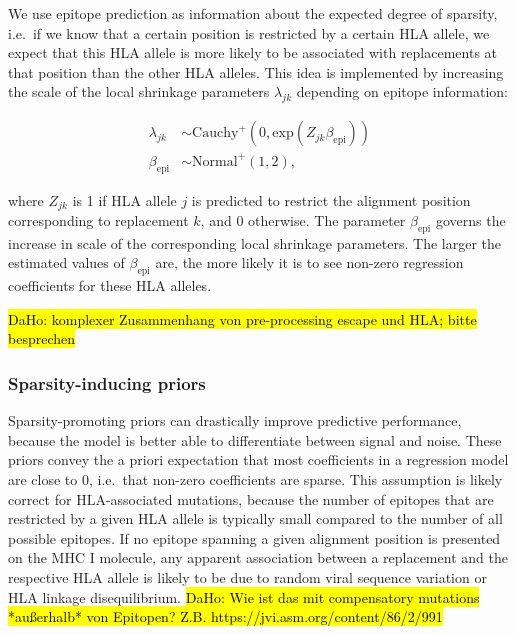 \documentclass{bioinfo}
\begin{document}
\begin{methods}
We use epitope prediction as information about the expected degree of sparsity, i.e.\ if we know that a certain position is restricted by a certain HLA allele, we expect that this HLA allele is more likely to be associated with replacements at that position than the other HLA alleles. This idea is implemented by increasing the scale of the local shrinkage parameters \(\lambda_{jk}\) depending on epitope information:

\begin{equation}
  \begin{aligned}
    \lambda_{jk} &\sim \text{Cauchy}^{+}(0, \text{exp}(Z_{jk}\beta_{\text{epi}})) \\
    \beta_{\text{epi}} &\sim \text{Normal}^{+}(1, 2),
  \end{aligned}
\end{equation}
 
where \(Z_{jk}\) is 1 if HLA allele \(j\) is predicted to restrict the alignment position corresponding to replacement \(k\), and 0 otherwise. The parameter \(\beta_{\text{epi}}\) governs the increase in scale of the  corresponding local shrinkage parameters. The larger the estimated values of \(\beta_{\text{epi}}\) are, the more likely it is to see non-zero regression coefficients for these HLA alleles.

\hl{DaHo: komplexer Zusammenhang von pre-processing escape und HLA; bitte besprechen}

\subsubsection{Sparsity-inducing priors}
  
Sparsity-promoting priors \citep{Piironen2017} can drastically improve predictive performance, because the model is better able to differentiate between signal and noise. These priors convey the a priori expectation that most coefficients in a regression model are close to 0, i.e.\ that non-zero coefficients are sparse. This assumption is likely correct for HLA-associated mutations, because the number of epitopes that are restricted by a given HLA allele is typically small compared to the number of all possible epitopes. If no epitope spanning a given alignment position is presented on the MHC I molecule, any apparent association between a replacement and the respective HLA allele is likely to be due to random viral sequence variation or HLA linkage disequilibrium. \hl{DaHo: Wie ist das mit compensatory mutations *außerhalb* von Epitopen? Z.B. https://jvi.asm.org/content/86/2/991}
  

\end{methods}
\end{document}
